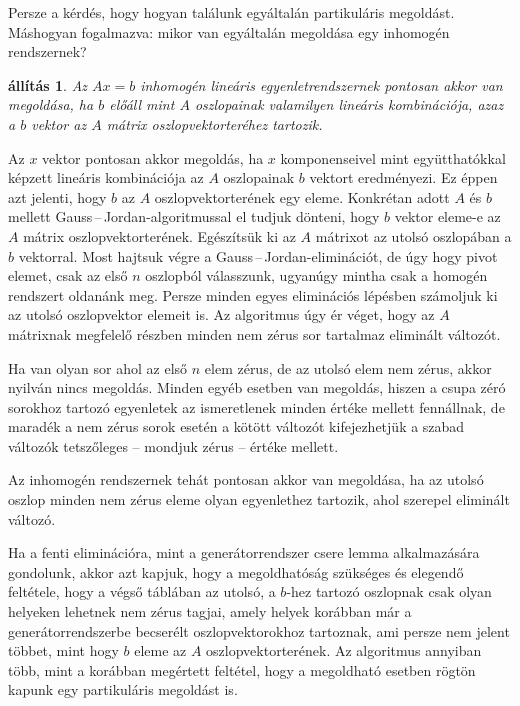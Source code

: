 \documentclass[a4paper, showtrims]{memoir}
\makeatletter
\renewenvironment{proof}[1][\proofname]
    {\par\pushQED{\qed}%
    \normalfont \topsep6\p@\@plus6\p@\relax
    \trivlist
    \item[\hskip\labelsep
        \itshape
    #1\@addpunct{:}]\ignorespaces}
    {\popQED\endtrivlist\@endpefalse}
\theoremstyle{plain}
\newtheorem{proposition}{állítás}[chapter]
\theoremstyle{remark}
\theoremstyle{definition}
\makeatother
\begin{document}
Persze a kérdés, hogy hogyan találunk egyáltalán partikuláris megoldást.
Máshogyan fogalmazva: mikor van egyáltalán megoldása egy inhomogén rendszernek?
\begin{proposition}
	Az $Ax=b$ inhomogén lineáris egyenletrendszernek pontosan akkor van megoldása,
	ha $b$ előáll mint $A$ oszlopainak valamilyen lineáris kombinációja,
	azaz a $b$ vektor az $A$ mátrix oszlopvektorteréhez tartozik.
\end{proposition}
\begin{proof}
    Az $x$ vektor pontosan akkor megoldás,
    ha $x$ komponenseivel mint együtthatókkal képzett lineáris kombinációja az $A$ oszlopainak $b$ vektort
    eredményezi. Ez éppen azt jelenti, hogy $b$ az $A$ oszlopvektorterének egy eleme.
\end{proof}
Konkrétan adott $A$ és $b$ mellett Gauss\,--\,Jordan-algoritmussal  el tudjuk dönteni, hogy
$b$ vektor eleme-e az $A$ mátrix oszlopvektorterének.
Egészítsük ki az $A$ mátrixot az utolsó oszlopában a $b$ vektorral.
Most hajtsuk végre a Gauss\,--\,Jordan-eliminációt, de úgy hogy pivot elemet,
csak az első $n$ oszlopból válasszunk, ugyanúgy mintha csak a homogén rendszert oldanánk meg.
Persze minden egyes eliminációs lépésben számoljuk ki az utolsó oszlopvektor elemeit is.
Az algoritmus úgy ér véget,
hogy az $A$ mátrixnak megfelelő részben minden nem zérus sor tartalmaz eliminált változót.

Ha van olyan sor ahol az első $n$ elem zérus, de az utolsó elem nem zérus,
akkor nyilván nincs megoldás.
Minden egyéb esetben van megoldás,
hiszen a csupa zéró sorokhoz tartozó egyenletek az ismeretlenek minden értéke mellett fennállnak,
de maradék a nem zérus sorok esetén a kötött változót
kifejezhetjük a szabad változók tetszőleges -- mondjuk zérus -- értéke mellett.

Az inhomogén rendszernek tehát pontosan akkor van megoldása,
ha az utolsó oszlop minden nem zérus eleme olyan egyenlethez tartozik,
ahol szerepel eliminált változó.

Ha a fenti eliminációra, mint a generátorrendszer csere lemma alkalmazására gondolunk,
akkor azt kapjuk, hogy a megoldhatóság szükséges és elegendő feltétele,
hogy a végső táblában az utolsó, a $b$-hez tartozó oszlopnak csak olyan helyeken lehetnek nem zérus tagjai,
amely helyek korábban már a generátorrendszerbe becserélt oszlopvektorokhoz tartoznak,
ami persze nem jelent többet, mint hogy $b$ eleme az $A$ oszlopvektorterének.
Az algoritmus annyiban több, mint a korábban megértett feltétel,
hogy a megoldható esetben rögtön kapunk egy partikuláris megoldást is.
\end{document}
